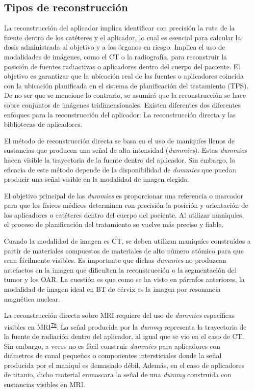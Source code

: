 \documentclass[
  a4paper,
]{scrreprt}
\begin{document}
\hypertarget{sec-tiposreconstruccion}{%
\subsection{Tipos de reconstrucción}\label{sec-tiposreconstruccion}}

La reconstrucción del aplicador implica identificar con precisión la
ruta de la fuente dentro de los catéteres y el aplicador, lo cual es
esencial para calcular la dosis administrada al objetivo y a los órganos
en riesgo. Implica el uso de modalidades de imágenes, como el CT o la
radiografía, para reconstruir la posición de fuentes radiactivas o
aplicadores dentro del cuerpo del paciente. El objetivo es garantizar
que la ubicación real de las fuentes o aplicadores coincida con la
ubicación planificada en el sistema de planificación del tratamiento
(TPS). De no ser que se mencione lo contrario, se asumirá que la
reconstrucción se hace sobre conjuntos de imágenes tridimensionales.
Existen diferentes dos diferentes enfoques para la reconstrucción del
aplicador: La reconstrucción directa y las bibliotecas de aplicadores.

El método de reconstrucción directa se basa en el uso de maniquíes
llenos de sustancias que producen una señal de alta intensidad
(\emph{dummies}). Estas \emph{dummies} hacen visible la trayectoria de
la fuente dentro del aplicador. Sin embargo, la eficacia de este método
depende de la disponibilidad de \emph{dummies} que puedan producir una
señal visible en la modalidad de imagen elegida.

El objetivo principal de las \emph{dummies} es proporcionar una
referencia o marcador para que los físicos médicos determinen con
precisión la posición y orientación de los aplicadores o catéteres
dentro del cuerpo del paciente. Al utilizar maniquíes, el proceso de
planificación del tratamiento se vuelve más preciso y fiable.

Cuando la modalidad de imagen es CT, se deben utilizan maniquíes
construídos a partir de materiales compuestos de materiales de alto
número atómico para que sean fácilmente visibles. Es importante que
dichas \emph{dummies} no produzcan artefactos en la imagen que
dificulten la reconstrucción o la segmentación del tumor y los OAR. La
cuestión es que como se ha visto en párrafos anteriores, la modalidad de
imagen ideal en BT de cérvix es la imagen por resonancia magnética
nuclear.

La reconstrucción directa sobre MRI requiere del uso de \emph{dummies}
específicas visibles en
MRI\textsuperscript{\protect\hyperlink{ref-perez-calatayud2009}{78}}. La
señal producida por la \emph{dummy} representa la trayectoria de la
fuente de radiación dentro del aplicador, al igual que se vio en el caso
de CT. Sin embargo, a veces no es fácil construir \emph{dummies} para
aplicadores con diámetros de canal pequeños o componentes intersticiales
donde la señal producida por el maniquí es demasiado débil. Además, en
el caso de aplicadores de titanio, dicho material enmascara la señal de
una \emph{dummy} construida con sustancias visibles en MRI.
\end{document}
